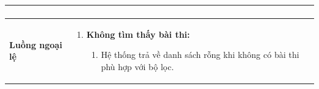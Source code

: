 {\begin{tabularx}{\textwidth}{|>{\raggedright\arraybackslash}X|>{\raggedright\arraybackslash}X|}
\begin{enumerate}
\begin{enumerate}
    \end{enumerate}
\end{enumerate} \\
\hline
\textbf{Luồng ngoại lệ} &
\begin{enumerate}
    \item \textbf{Không tìm thấy bài thi:}
    \begin{enumerate}
        \item[2Err.] Hệ thống trả về danh sách rỗng khi không có bài thi phù hợp với bộ lọc.
    \end{enumerate}
\end{enumerate} \\
\hline
\end{tabularx}
}
